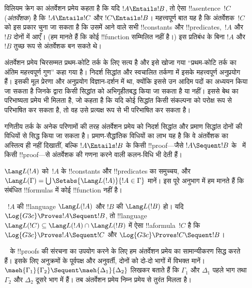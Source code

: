 \documentclass[../../../include/open-logic-section]{subfiles}
\begin{document}


विलियम क्रेग का अंतर्वेशन प्रमेय कहता है कि यदि $!A \Entails !B$, तो ऐसा
!!a{sentence}~$!C$ (\emph{अंतर्वेशक}) है कि $!A \Entails !C$ और $!C \Entails
!B$। महत्त्वपूर्ण बात यह है कि अंतर्वेशक~$!C$ को इस प्रकार चुना जा सकता है कि
उसमें आने वाले सभी !!{constant}s और !!{predicate}s,~$!A$ और~$!B$ दोनों में
आएँ। (हम मानते हैं कि कोई !!{function} सम्मिलित नहीं है।) इस प्रतिबंध के बिना
$!A$ और $!B$ तुच्छ रूप से अंतर्वेशक बन सकते थे।

अंतर्वेशन प्रमेय चिरसम्मत प्रथम-कोटि तर्क के लिए सत्य है और इसे खोजा गया
``प्रथम-कोटि तर्क का अंतिम महत्त्वपूर्ण गुण'' कहा गया है। निदर्श सिद्धांत और
स्वचालित तर्कणा में इसके महत्त्वपूर्ण अनुप्रयोग हैं। इसकी मूल प्रेरणा और
अनुप्रयोग विज्ञान-दर्शन में था, क्योंकि इससे उन आदिम पदों का अध्ययन किया जा
सकता है जिनके द्वारा किसी सिद्धांत को अभिगृहीतबद्ध किया जा सकता है या नहीं।
इससे बेथ का परिभाष्यता प्रमेय भी मिलता है, जो कहता है कि यदि कोई सिद्धांत किसी
संकल्पना को परोक्ष रूप से परिभाषित कर सकता है, तो वह उसे प्रत्यक्ष रूप से भी
परिभाषित कर सकता है।

गणितीय तर्क के अनेक परिणामों की तरह अंतर्वेशन प्रमेय को निदर्श सिद्धांत और
प्रमाण सिद्धांत दोनों की विधियों से सिद्ध किया जा सकता है। प्रमाण-सैद्धांतिक
विधियों का लाभ यह है कि वे अंतर्वेशक का अस्तित्व ही नहीं दिखातीं, बल्कि $!A
\Entails !B$ के किसी !!{proof}—जैसे $!A \Sequent !B$ के~ में किसी
!!{proof}—से अंतर्वेशक की गणना करने वाली कलन-विधि भी देती हैं।

$\Lang L(!A)$ को~$!A$ के !!{constant}s और !!{predicate}s का समुच्चय, और
$\Lang L(\Gamma) = \bigcup \Setabs{\Lang L(!A)}{!A \in \Gamma}$ मानें। इस
पूरे अनुभाग में हम मानते हैं कि संबंधित !!{formula}s में कोई !!{function} नहीं
है।

\begin{thm}[क्रेग अंतर्वेशन प्रमेय]
~$!A$ की !!{language} $\Lang L(!A)$ और $!B$ की $\Lang L(!B)$ हो। यदि
$\Log{G3c} \Proves !A \Sequent !B$, तो !!{language}~$\Lang L(!C) \subseteq
\Lang L(!A) \cap \Lang L(!B)$ में ऐसा !!a{formula}~$!C$ है कि $\Log{G3c}
\Proves !A \Sequent !C$ और $\Log{G3c} \Proves !C \Sequent !B$।
\end{thm}

~ के !!{proof}s की संरचना का उपयोग करने के लिए हम अंतर्वेशन प्रमेय
का सामान्यीकरण सिद्ध करते हैं। इसके लिए अनुक्रमों के पूर्वपक्ष और अनुवर्ती,
दोनों को दो-दो भागों में विभक्त मानें। $\maeh{\Gamma_1}{\Gamma_2} \Sequent
\maeh{\Delta_1}{\Delta_2}$ लिखकर बताते हैं कि $\Gamma_1$ और $\Delta_1$ पहले
भाग तथा $\Gamma_2$ और $\Delta_2$ दूसरे भाग में हैं। तब अंतर्वेशन प्रमेय निम्न
प्रमेय से तुरंत मिलता है।
\end{document}
